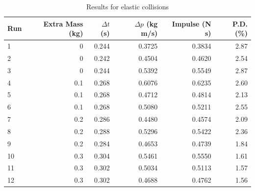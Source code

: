 \begin{table}[ht]
    \centering
    \begin{tabular}{|l|r|r|r|r|r|}
        \hline
        Run & Extra Mass (kg) & $\Delta t$ (s) & $\Delta p$ (kg m/s) & Impulse (N s) & P.D. (\%) \\  
        \hline
        1 & 0 & 0.244 & 0.3725 & 0.3834 & 2.87 \\
        2 & 0 & 0.242 & 0.4504 & 0.4620 & 2.54 \\
        3 & 0 & 0.244 & 0.5392 & 0.5549 & 2.87 \\
        \hline
        4 & 0.1 & 0.268 & 0.6076 & 0.6235 & 2.60 \\
        5 & 0.1 & 0.268 & 0.4712 & 0.4814 & 2.13 \\
        6 & 0.1 & 0.268 & 0.5080 & 0.5211 & 2.55 \\
        \hline
        7 & 0.2 & 0.286 & 0.4480 & 0.4574 & 2.09 \\
        8 & 0.2 & 0.288 & 0.5296 & 0.5422 & 2.36 \\
        9 & 0.2 & 0.284 & 0.4653 & 0.4739 & 1.84 \\
        \hline
        10 & 0.3 & 0.304 & 0.5461 & 0.5550 & 1.61 \\
        11 & 0.3 & 0.302 & 0.5034 & 0.5113 & 1.57 \\
        12 & 0.3 & 0.302 & 0.4688 & 0.4762 & 1.56 \\
        \hline
    \end{tabular}
    \caption{Results for elastic collisions}
    \label{table:08.results.elastic}
\end{table}
